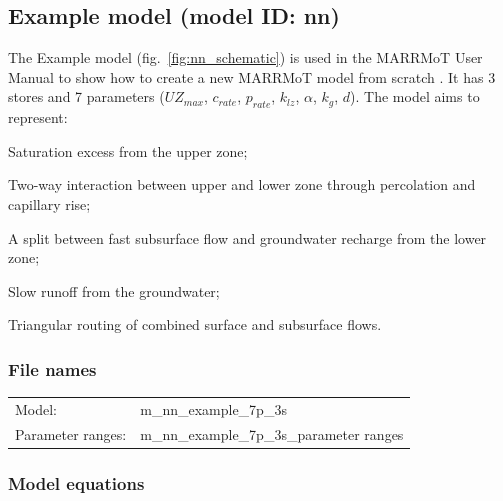 \subsection*{Example model (model ID: nn)}
The Example model (fig.~\ref{fig:nn_schematic}) is used in the MARRMoT User Manual to show how to create a new MARRMoT model from scratch \citep{Knoben2018b}. It has 3 stores and 7 parameters ($UZ_{max}$, $c_{rate}$, $p_{rate}$, $k_{lz}$, $ \alpha$, $k_{g}$, $d$). The model aims to represent:

\begin{itemizecompact}
\item Saturation excess from the upper zone;
\item Two-way interaction between upper and lower zone through percolation and capillary rise;
\item A split between fast subsurface flow and groundwater recharge from the lower zone;
\item Slow runoff from the groundwater;
\item Triangular routing of combined surface and subsurface flows.
\end{itemizecompact}

\subsubsection*{File names}
\begin{tabular}{@{}ll}
Model:  &m\_nn\_example\_7p\_3s \\
Parameter ranges: &m\_nn\_example\_7p\_3s\_parameter ranges \\
\end{tabular}

\subsubsection*{Model equations}


